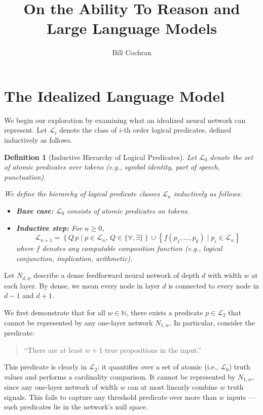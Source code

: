 \documentclass[12pt]{article}
\theoremstyle{plain}
\newtheorem{definition}{Definition}
\begin{document}
\title{On the Ability To Reason and Large Language Models}
\author{Bill Cochran}
\maketitle

\section{The Idealized Language Model}

We begin our exploration by examining what an idealized neural network can represent. Let $\mathcal{L}_i$ denote the class of $i$-th order logical predicates, defined inductively as follows.

\begin{definition}[Inductive Hierarchy of Logical Predicates]
Let $\mathcal{L}_0$ denote the set of atomic predicates over tokens (e.g., symbol identity, part of speech, punctuation).

We define the hierarchy of logical predicate classes $\mathcal{L}_n$ inductively as follows:
\begin{itemize}
  \item \textbf{Base case:} $\mathcal{L}_0$ consists of atomic predicates on tokens.
  \item \textbf{Inductive step:} For $n \geq 0$,
  \[
    \mathcal{L}_{n+1} = \left\{ Q\,p \mid p \in \mathcal{L}_n,\, Q \in \{\forall, \exists\} \right\}
    \cup
    \left\{ f(p_1, \ldots, p_k) \mid p_i \in \mathcal{L}_n \right\}
  \]
  where $f$ denotes any computable composition function (e.g., logical conjunction, implication, arithmetic).
\end{itemize}
\end{definition}

Let $N_{d,w}$ describe a dense feedforward neural network of depth $d$ with width $w$ at each layer. By dense,
we mean every node in layer $d$ is connected to every node in $d-1$ and $d+1$.

We first demonstrate that for all $w \in \mathbb{N}$, there exists a predicate $p \in \mathcal{L}_2$ that cannot be represented by any one-layer network $N_{1,w}$. In particular, consider the predicate:

\begin{quote}
“There are at least $w+1$ true propositions in the input.”
\end{quote}

This predicate is clearly in $\mathcal{L}_2$: it quantifies over a set of atomic (i.e., $\mathcal{L}_0$) truth values and performs a cardinality comparison. It cannot be represented by $N_{1,w}$, since any one-layer network of width $w$ can at most linearly combine $w$ truth signals. This fails to capture any threshold predicate over more than $w$ inputs — such predicates lie in the network's null space.
\end{document}
